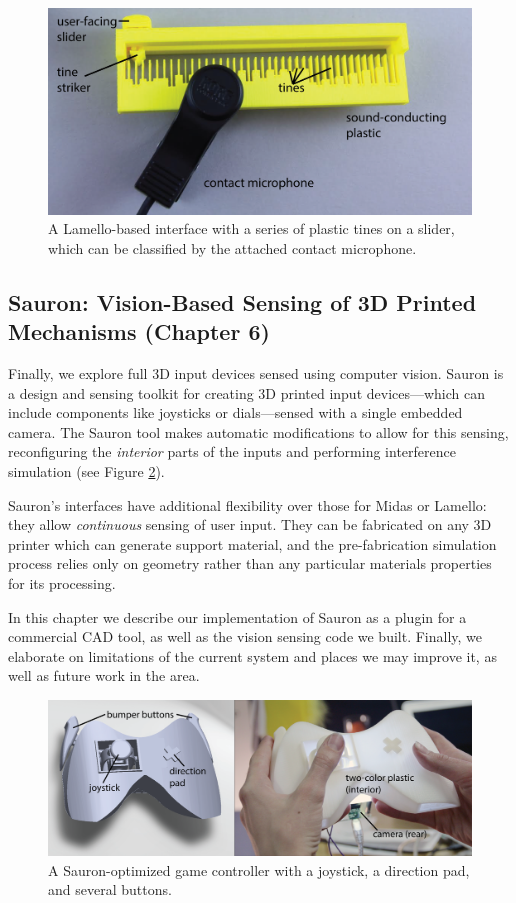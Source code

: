 \begin{figure}
\centering
\includegraphics[width=5in]{figures/lamello/lamello-intro-callouts.png}
\caption{A Lamello-based interface with a series of plastic tines on a slider, which can be classified by the attached contact microphone.}
\label{fig:lamello-intro}
\end{figure}

\subsection{Sauron: Vision-Based Sensing of 3D Printed Mechanisms (Chapter 6)}

Finally, we explore full 3D input devices sensed using computer vision. Sauron is a design and sensing toolkit for creating 3D printed input devices---which can include components like joysticks or dials---sensed with a single embedded camera. The Sauron tool makes automatic modifications to allow for this sensing, reconfiguring the \emph{interior} parts of the inputs and performing interference simulation (see Figure \ref{fig:sauron-intro}).

Sauron's interfaces have additional flexibility over those for Midas or Lamello: they allow \emph{continuous} sensing of user input. They can be fabricated on any 3D printer which can generate support material, and the pre-fabrication simulation process relies only on geometry rather than any particular materials properties for its processing. %

In this chapter we describe our implementation of Sauron as a plugin for a commercial CAD tool, as well as the vision sensing code we built. Finally, we elaborate on limitations of the current system and places we may improve it, as well as future work in the area.

\begin{figure}[h]
\centering
\includegraphics[width=6in]{figures/sauron/sauron-intro-callouts.png}
\caption{A Sauron-optimized game controller with a joystick, a direction pad, and several buttons.}
\label{fig:sauron-intro}
\end{figure}


